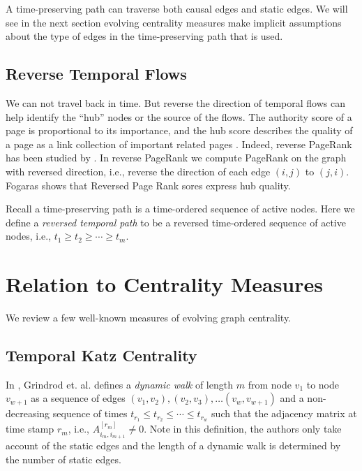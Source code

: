 \documentclass[12pt]{article}
\theoremstyle{definition}
\begin{document}
A time-preserving path can traverse both causal edges and static edges.
We will see in the next section evolving centrality measures make implicit assumptions about the type of edges in the 
time-preserving path that is used.


\subsection{Reverse Temporal Flows}
\label{sec:reverse-temp-flows}

We can not travel back in time. But reverse the direction of temporal flows can help
identify the ``hub'' nodes or the source of the flows. The authority score of a page is 
proportional to its importance, and the hub score describes the quality of a page as a link collection of important related pages \cite{kleinberg99}.
Indeed, reverse PageRank has
been studied by \cite{fogaras03, bar08, gleich15}. In reverse PageRank we compute PageRank on the graph with reversed direction, i.e., reverse the direction of each edge $(i,j)$ to $(j, i)$.
Fogaras \cite{fogaras03} shows that Reversed Page Rank sores express hub quality.


Recall a time-preserving path is a time-ordered sequence of active nodes. Here we define a \emph{reversed temporal path} to be a reversed time-ordered sequence of active nodes, i.e.,
$t_1 \ge t_2 \ge \cdots \ge t_m$.


\section{Relation to Centrality Measures}
\label{sec:topol-temp-flow}

We review a few well-known measures of evolving graph centrality. 

\subsection{Temporal Katz Centrality}
\label{sec:temp-katz-centr}

In \cite{grindrod11}, Grindrod et. al. defines a \emph{dynamic walk} of length $m$ from
node $v_1$ to node $v_{w+1}$  as a sequence of edges 
$(v_1, v_2), (v_2, v_3), \ldots (v_w, v_{w+1})$ and a non-decreasing sequence of times
$t_{r_1} \leq t_{r_2} \leq \cdots \leq t_{r_w}$ such that the adjacency matrix at time stamp
$r_m$, i.e., $A_{i_m, i_{m+1}}^{[r_m]} \ne 0$. Note in this definition, the authors only take account of the static edges and the length of a dynamic walk is determined by the number of static edges.
\end{document}
